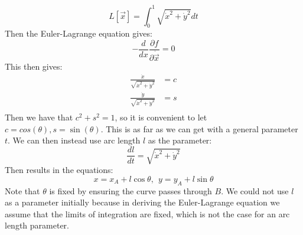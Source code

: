 \documentclass[../Main.tex]{subfiles}
\begin{document}
\begin{equation*}
    L[\vec{x}] = \int_0^1 \sqrt{\dot{x}^2 + \dot{y}^2} dt
\end{equation*}
Then the Euler-Lagrange equation gives:
\begin{equation*}
    -\frac{d}{dx} \frac{\partial f}{\partial \dot{\vec{x}}} = 0
\end{equation*}
This then gives:
\begin{align*}
    \frac{\dot{x}}{\sqrt{\dot{x}^2 + \dot{y}^2}} &= c \\
    \frac{\dot{y}}{\sqrt{\dot{x}^2 + \dot{y}^2}} &= s \\
\end{align*}
Then we have that $c^2 + s^2 = 1$, so it is convenient to let $c = cos(\theta), s = \sin(\theta)$.
This is as far as we can get with a general parameter $t$. We can then instead use arc length $l$ as the parameter:
\begin{equation*}
    \frac{dl}{dt} = \sqrt{\dot{x}^2 + \dot{y}^2}
\end{equation*}
Then results in the equations:
\begin{equation*}
    x = x_A + l \cos{\theta},~~y = y_A + l\sin{\theta}
\end{equation*}
Note that $\theta$ is fixed by ensuring the curve passes through $B$. We could not use $l$ as a parameter initially because in deriving the Euler-Lagrange equation we assume that the limits of integration are fixed, which is not the case for an arc length parameter.
\end{document}
